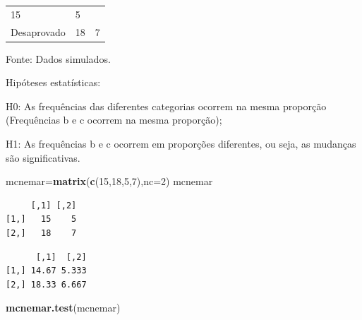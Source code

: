 \documentclass[12pt,portuguese,oneside]{book}
\newenvironment{Shaded}{\begin{snugshade}}{\end{snugshade}}
\newcommand{\KeywordTok}[1]{\textcolor[rgb]{0.13,0.29,0.53}{\textbf{#1}}}
\newcommand{\DataTypeTok}[1]{\textcolor[rgb]{0.13,0.29,0.53}{#1}}
\newcommand{\DecValTok}[1]{\textcolor[rgb]{0.00,0.00,0.81}{#1}}
\newcommand{\OperatorTok}[1]{\textcolor[rgb]{0.81,0.36,0.00}{\textbf{#1}}}
\newcommand{\NormalTok}[1]{#1}
\begin{document}
\begin{longtable}[]{@{}lll@{}}
\begin{minipage}[t]{0.25\columnwidth}
15\strut
\end{minipage} & \begin{minipage}[t]{0.22\columnwidth}\raggedright\strut
5\strut
\end{minipage}\tabularnewline
\begin{minipage}[t]{0.35\columnwidth}\raggedright\strut
Desaprovado\strut
\end{minipage} & \begin{minipage}[t]{0.25\columnwidth}\raggedright\strut
18\strut
\end{minipage} & \begin{minipage}[t]{0.22\columnwidth}\raggedright\strut
7\strut
\end{minipage}\tabularnewline
\bottomrule
\end{longtable}

Fonte: Dados simulados.

Hipóteses estatísticas:

H0: As frequências das diferentes categorias ocorrem na mesma proporção
(Frequências b e c ocorrem na mesma proporção);

H1: As frequências b e c ocorrem em proporções diferentes, ou seja, as
mudanças são significativas.

\begin{Shaded}
\begin{Highlighting}[]
\NormalTok{mcnemar=}\KeywordTok{matrix}\NormalTok{(}\KeywordTok{c}\NormalTok{(}\DecValTok{15}\NormalTok{,}\DecValTok{18}\NormalTok{,}\DecValTok{5}\NormalTok{,}\DecValTok{7}\NormalTok{),}\DataTypeTok{nc=}\DecValTok{2}\NormalTok{)}
\NormalTok{mcnemar}
\end{Highlighting}
\end{Shaded}

\begin{verbatim}
     [,1] [,2]
[1,]   15    5
[2,]   18    7
\end{verbatim}

\begin{Shaded}
\end{Shaded}

\begin{verbatim}
      [,1]  [,2]
[1,] 14.67 5.333
[2,] 18.33 6.667
\end{verbatim}

\begin{Shaded}
\begin{Highlighting}[]
\KeywordTok{mcnemar.test}\NormalTok{(mcnemar)}
\end{Highlighting}
\end{Shaded}
\end{document}
